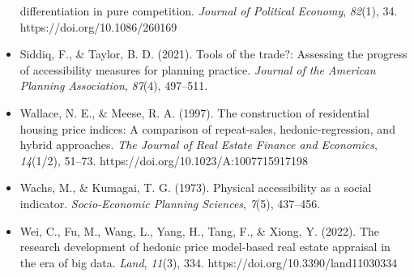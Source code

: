 \documentclass[
  12pt,
]{report}
\begin{document}
\begin{itemize}
  differentiation in pure competition. \emph{Journal of Political
  Economy}, \emph{82}(1), 34. https://doi.org/10.1086/260169
\item
  Siddiq, F., \& Taylor, B. D. (2021). Tools of the trade?: Assessing
  the progress of accessibility measures for planning practice.
  \emph{Journal of the American Planning Association}, \emph{87}(4),
  497--511.
\item
  Wallace, N. E., \& Meese, R. A. (1997). The construction of
  residential housing price indices: A comparison of repeat-sales,
  hedonic-regression, and hybrid approaches. \emph{The Journal of Real
  Estate Finance and Economics}, \emph{14}(1/2), 51--73.
  https://doi.org/10.1023/A:1007715917198
\item
  Wachs, M., \& Kumagai, T. G. (1973). Physical accessibility as a
  social indicator. \emph{Socio-Economic Planning Sciences},
  \emph{7}(5), 437--456.
\item
  Wei, C., Fu, M., Wang, L., Yang, H., Tang, F., \& Xiong, Y. (2022).
  The research development of hedonic price model-based real estate
  appraisal in the era of big data. \emph{Land}, \emph{11}(3), 334.
  https://doi.org/10.3390/land11030334
\end{itemize}
\end{document}
